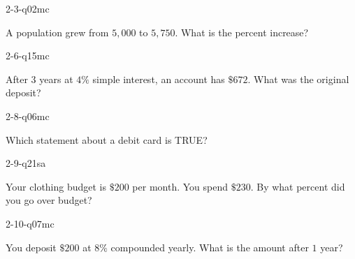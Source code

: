 \documentclass[12pt, fleqn, openany]{studyGuide}
\begin{document}
\begin{practiceQuestion}{2-3-q02}{mc}
\begin{questionText}
A population grew from $5{,}000$ to $5{,}750$. What is the percent increase?
\end{questionText}
\end{practiceQuestion}

\begin{practiceQuestion}{2-6-q15}{mc}
\begin{questionText}
After $3$ years at $4\%$ simple interest, an account has $\$672$. What was the original deposit?
\end{questionText}
\end{practiceQuestion}

\begin{practiceQuestion}{2-8-q06}{mc}
\begin{questionText}
Which statement about a debit card is TRUE?
\end{questionText}
\end{practiceQuestion}

\begin{practiceQuestion}{2-9-q21}{sa}
\begin{questionText}
Your clothing budget is $\$200$ per month. You spend $\$230$. By what percent did you go over budget?
\end{questionText}
\end{practiceQuestion}

\begin{practiceQuestion}{2-10-q07}{mc}
\begin{questionText}
You deposit $\$200$ at $8\%$ compounded yearly. What is the amount after $1$ year?
\end{questionText}
\end{practiceQuestion}
\end{document}
